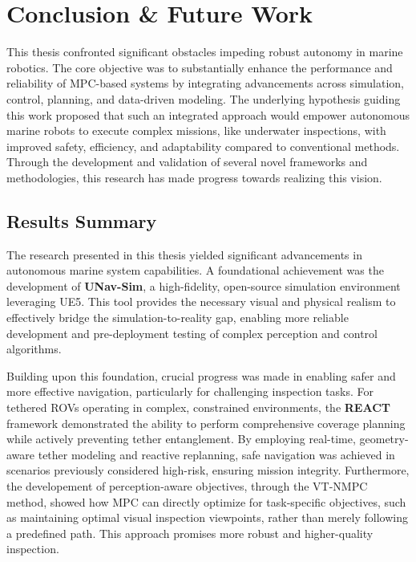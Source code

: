 \chapter{Conclusion \& Future Work}
This thesis confronted significant obstacles impeding robust autonomy in marine robotics. The core objective was to substantially enhance the performance and reliability of \ac{MPC}-based systems by integrating advancements across simulation, control, planning, and data-driven modeling. The underlying hypothesis guiding this work proposed that such an integrated approach would empower autonomous marine robots to execute complex missions, like underwater inspections, with improved safety, efficiency, and adaptability compared to conventional methods. Through the development and validation of several novel frameworks and methodologies, this research has made progress towards realizing this vision.

\section{Results Summary}


\label{sec:summary_contributions}

The research presented in this thesis yielded significant advancements in autonomous marine system capabilities. A foundational achievement was the development of \textbf{UNav-Sim}, a high-fidelity, open-source simulation environment leveraging UE5. This tool provides the necessary visual and physical realism to effectively bridge the simulation-to-reality gap, enabling more reliable development and pre-deployment testing of complex perception and control algorithms.

Building upon this foundation, crucial progress was made in enabling safer and more effective navigation, particularly for challenging inspection tasks. For tethered \acp{ROV} operating in complex, constrained environments, the \textbf{REACT} framework demonstrated the ability to perform comprehensive coverage planning while actively preventing tether entanglement. By employing real-time, geometry-aware tether modeling and reactive replanning, safe navigation was achieved in scenarios previously considered high-risk, ensuring mission integrity. Furthermore, the developement of perception-aware objectives, through the VT-NMPC method, showed how MPC can directly optimize for task-specific objectives, such as maintaining optimal visual inspection viewpoints, rather than merely following a predefined path. This approach promises more robust and higher-quality inspection.

